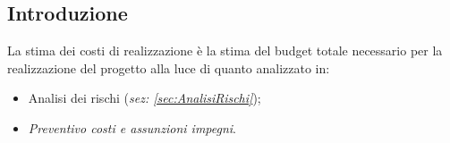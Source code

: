 \subsection{Introduzione}
La stima dei costi di realizzazione è la stima del budget totale necessario per la realizzazione del progetto alla luce di quanto analizzato in: 
\begin{itemize}
    \item Analisi dei rischi (\textit{sez: \ref{sec:AnalisiRischi}});
    \item \textit{Preventivo costi e assunzioni impegni}.
\end{itemize}
